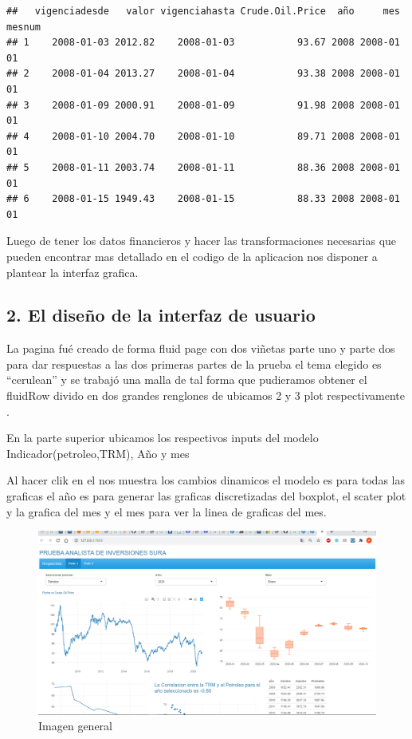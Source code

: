 \documentclass[]{article}
\begin{document}
\begin{verbatim}
##   vigenciadesde   valor vigenciahasta Crude.Oil.Price  año     mes mesnum
## 1    2008-01-03 2012.82    2008-01-03           93.67 2008 2008-01     01
## 2    2008-01-04 2013.27    2008-01-04           93.38 2008 2008-01     01
## 3    2008-01-09 2000.91    2008-01-09           91.98 2008 2008-01     01
## 4    2008-01-10 2004.70    2008-01-10           89.71 2008 2008-01     01
## 5    2008-01-11 2003.74    2008-01-11           88.36 2008 2008-01     01
## 6    2008-01-15 1949.43    2008-01-15           88.33 2008 2008-01     01
\end{verbatim}

Luego de tener los datos financieros y hacer las transformaciones
necesarias que pueden encontrar mas detallado en el codigo de la
aplicacion nos disponer a plantear la interfaz grafica.

\hypertarget{el-diseno-de-la-interfaz-de-usuario}{%
\subsection{2. El diseño de la interfaz de
usuario}\label{el-diseno-de-la-interfaz-de-usuario}}

La pagina fué creado de forma fluid page con dos viñetas parte uno y
parte dos para dar respuestas a las dos primeras partes de la prueba el
tema elegido es ``cerulean'' y se trabajó una malla de tal forma que
pudieramos obtener el fluidRow divido en dos grandes renglones de
ubicamos 2 y 3 plot respectivamente .

En la parte superior ubicamos los respectivos inputs del modelo
Indicador(petroleo,TRM), Año y mes

Al hacer clik en el nos muestra los cambios dinamicos el modelo es para
todas las graficas el año es para generar las graficas discretizadas del
boxplot, el scater plot y la grafica del mes y el mes para ver la linea
de graficas del mes.

\begin{figure}
\centering
\includegraphics{evidencia/control.png}
\caption{Imagen general}
\end{figure}
\end{document}
